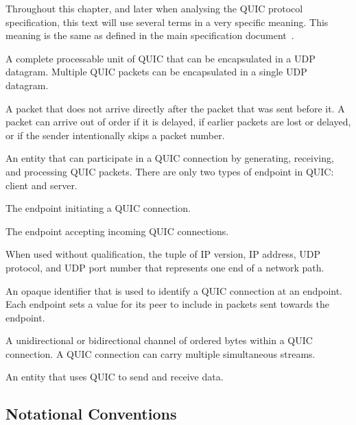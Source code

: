 Throughout this chapter, and later when analysing the QUIC protocol specification, this text will
use several terms in a very specific meaning. This meaning is the same as defined in the
main specification document~\cite[Section~1.2]{draft-ietf-quic-transport}.


\begin{description}

    A complete processable unit of QUIC that can be
    encapsulated in a UDP datagram.  Multiple QUIC packets can be
    encapsulated in a single UDP datagram.

    A packet that does not arrive directly after the packet that was
    sent before it.  A packet can arrive out of order if it is delayed, if earlier packets are
    lost or delayed, or if the sender intentionally skips a packet number.

     An entity that can participate in a QUIC connection by
      generating, receiving, and processing QUIC packets.  There are
      only two types of endpoint in QUIC: client and server.

     The endpoint initiating a QUIC connection.

     The endpoint accepting incoming QUIC connections.

    When used without qualification, the tuple of IP version,
    IP address, UDP protocol, and UDP port number that represents one
    end of a network path.

    An opaque identifier that is used to identify a QUIC
    connection at an endpoint.  Each endpoint sets a value for its
    peer to include in packets sent towards the endpoint.

    A unidirectional or bidirectional channel of ordered bytes
    within a QUIC connection.  A QUIC connection can carry multiple
    simultaneous streams.

    An entity that uses QUIC to send and receive data.

\end{description}

\subsection{Notational Conventions}

